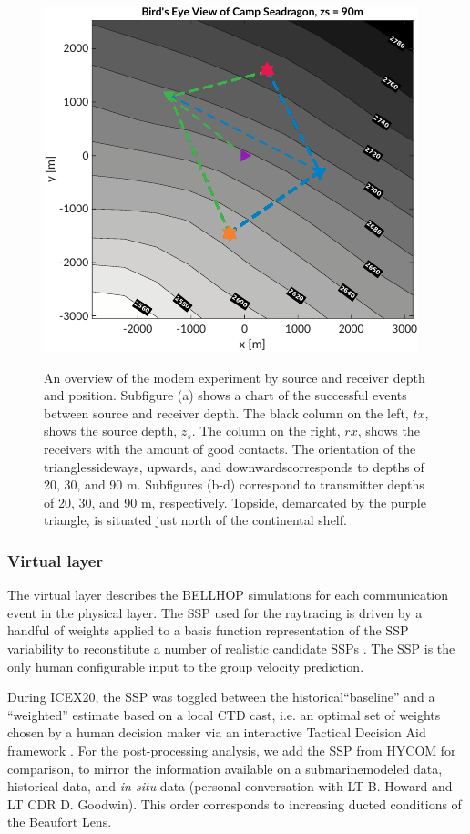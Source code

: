 \begin{figure}[h!]
  \includegraphics[width=.48\textwidth]{figs/Fig3d.pdf} \\
  \caption{An overview of the modem experiment by source and receiver depth and position. Subfigure (a) shows a chart of the successful events between source and receiver depth. The black column on the left, $tx$, shows the source depth, $z_s$. The column on the right, $rx$, shows the receivers with the amount of good contacts. The orientation of the triangles\textemdash sideways, upwards, and downwards\textemdash corresponds to depths of 20, 30, and 90 m. Subfigures (b-d) correspond to transmitter depths of 20, 30, and 90 m, respectively. Topside, demarcated by the purple triangle, is situated just north of the continental shelf.}
  \label{fig:overview}
  \end{figure}

\clearpage

\subsubsection{Virtual layer}
The virtual layer describes the BELLHOP simulations for each communication event in the physical layer.
The SSP used for the raytracing is driven by a handful of weights applied to a basis function representation
of the SSP variability to reconstitute a number of realistic candidate SSPs \citep{leblanc_underwater_1980,lin_merging_2010}.
The SSP is the only human configurable input to the group velocity prediction.

 During ICEX20, the SSP was toggled between the historical``baseline'' and a ``weighted'' estimate based on a local CTD cast, i.e. an optimal set of weights chosen by a human decision maker  via an interactive Tactical Decision Aid framework \citep{bhatt_embedded_2021}.
 For the post-processing analysis, we add the SSP from HYCOM for comparison, to mirror the information available on a submarine\textemdash modeled data, historical data, and \textit{in situ} data (personal conversation with LT B. Howard and LT CDR D. Goodwin).
This order corresponds to increasing ducted conditions of the Beaufort Lens.

